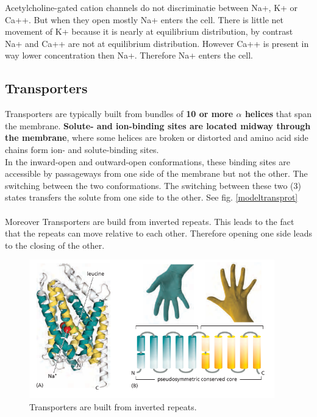 \documentclass[../main.tex]{subfiles}
\begin{document}
\begin{ExWithTitle}{Acetylcholine-gated cation channels do not discriminatie between Na+, K+ or Ca++. But when they open mostly Na+ enters the cell.}
	There is little net movement of K+ because it is nearly at equilibrium distribution, by contrast Na+  and Ca++ are not at equilibrium distribution. However Ca++ is present in way lower concentration then Na+. Therefore Na+ enters the cell. 
\end{ExWithTitle}



\subsection{Transporters}
Transporters are typically built from bundles of \textbf{10 or more $\alpha$ helices} that span the membrane. \textbf{Solute- and ion-binding sites are located midway through the membrane}, where some helices are broken or distorted and amino acid side chains form ion- and solute-binding sites. \\
In the inward-open and outward-open conformations, these binding sites are accessible by passageways from one side of the membrane but not the other. The switching between the two conformations. The switching between these two (3) states transfers the solute from one side to the other. See fig. \ref{modeltransprot}\\
\\
Moreover Transporters are build from inverted repeats. This leads to the fact that the repeats can move relative to each other. Therefore opening one side leads to the closing of the other. 

\begin{figure}[H]
	\centering
	\includegraphics[height = 6cm]{8}
	\caption{Transporters are built from inverted repeats.}
\end{figure}
\end{document}
